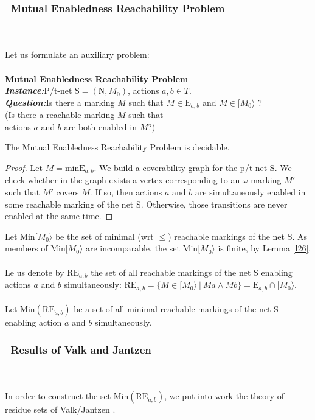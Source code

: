 \documentclass[a4paper]{llncs}
\begin{document}
\subsubsection{\textbullet \ Mutual Enabledness Reachability Problem}\mbox{ }\\
\\
Let us formulate an auxiliary problem:
\\ \\
\textbf{Mutual Enabledness Reachability Problem}
\\
\indent\textbf{\emph{Instance:}}P/t-net $\mathrm{S}=(\mathrm{N}, M_0)$, actions $a,b\in T$.\\
\indent\textbf{\emph{Question:}}Is there a marking $M$ such that $M\in \mathrm{E}_{a,b}$ and $M \in[M_0\rangle$ ? \\
\indent(Is there a reachable marking $M$ such that \\ \indent actions $a$ and $b$ are both enabled in $M$?)
\\

\begin{theorem}
\label{t413}
The Mutual Enabledness Reachability Problem is decidable.
\end{theorem}

\begin{proof}
Let $M=\mathrm{minE}_{a,b}$. We build a coverability graph for the p/t-net S. We check whether in the graph exists a vertex corresponding to an $\omega$-marking $M'$ such that $M'$ covers $M$. If so, then actions $a$ and $b$ are simultaneously enabled in some reachable marking of the net S. Otherwise, those transitions are never enabled at the same time. 	
\end{proof}
Let $\mathrm{Min}[M_0\rangle$ be the set of minimal (wrt $\leq$) reachable markings of the net S. As members of $\mathrm{Min}[M_0\rangle$ are incomparable, the set $\mathrm{Min}[M_0\rangle$  is finite, by Lemma \ref{l26}.\\ \\
Le us denote by $\mathrm{RE}_{a,b}$ the set of all reachable markings of the net S enabling actions $a$ and $b$ simultaneously: $\mathrm{RE}_{a,b}= \{M \in [M_0\rangle \ | \ Ma\land Mb\} = \mathrm{E}_{a,b} \cap  [M_0\rangle$. \\ \\
Let  $\mathrm{Min}(\mathrm{RE}_{a,b})$ be a set of all minimal reachable markings of the net S enabling action $a$ and $b$ simultaneously.


\subsubsection{\textbullet \ Results of Valk and Jantzen}\mbox{ }\\
\\
In order to construct the set $\mathrm{Min}(\mathrm{RE}_{a,b})$, we put into work the theory of residue sets of Valk/Jantzen \cite{ValkJantzen}.
\end{document}
